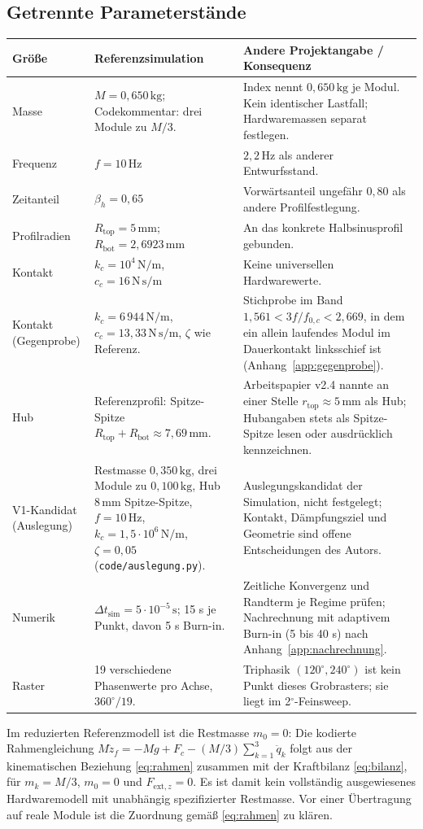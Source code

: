 \documentclass[11pt,a4paper]{article}
\begin{document}
\subsection{Getrennte Parameterstände}
\begin{longtable}{@{}L{.24\textwidth}L{.33\textwidth}L{.38\textwidth}@{}}
\toprule\textbf{Größe}&\textbf{Referenzsimulation}&\textbf{Andere Projektangabe / Konsequenz}\\\midrule\endhead
Masse&$M=0{,}650\,\mathrm{kg}$; Codekommentar: drei Module zu $M/3$.&Index nennt $0{,}650\,\mathrm{kg}$ je Modul. Kein identischer Lastfall; Hardwaremassen separat festlegen.\\
Frequenz&$f=10\,\mathrm{Hz}$&$2{,}2\,\mathrm{Hz}$ als anderer Entwurfsstand.\\
Zeitanteil&$\beta_h=0{,}65$&Vorwärtsanteil ungefähr $0{,}80$ als andere Profilfestlegung.\\
Profilradien&$R_{\mathrm{top}}=5\,\mathrm{mm}$; $R_{\mathrm{bot}}=2{,}6923\,\mathrm{mm}$&An das konkrete Halbsinusprofil gebunden.\\
Kontakt&$k_c=10^4\,\mathrm{N/m}$, $c_c=16\,\mathrm{N\,s/m}$&Keine universellen Hardwarewerte.\\
Kontakt (Gegenprobe)&$k_c=6\,944\,\mathrm{N/m}$, $c_c=13{,}33\,\mathrm{N\,s/m}$, $\zeta$ wie Referenz.&Stichprobe im Band $1{,}561<3f/f_{0,c}<2{,}669$, in dem ein allein laufendes Modul im Dauerkontakt linksschief ist (Anhang~\ref{app:gegenprobe}).\\
Hub&Referenzprofil: Spitze-Spitze $R_{\mathrm{top}}+R_{\mathrm{bot}}\approx7{,}69\,\mathrm{mm}$.&Arbeitspapier v2.4 nannte an einer Stelle $r_{\mathrm{top}}\approx5\,\mathrm{mm}$ als Hub; Hubangaben stets als Spitze-Spitze lesen oder ausdrücklich kennzeichnen.\\
V1-Kandidat (Auslegung)&Restmasse $0{,}350\,\mathrm{kg}$, drei Module zu $0{,}100\,\mathrm{kg}$, Hub $8\,\mathrm{mm}$ Spitze-Spitze, $f=10\,\mathrm{Hz}$, $k_c=1{,}5\cdot10^6\,\mathrm{N/m}$, $\zeta=0{,}05$ (\texttt{code/auslegung.py}).&Auslegungskandidat der Simulation, nicht festgelegt; Kontakt, Dämpfungsziel und Geometrie sind offene Entscheidungen des Autors.\\
Numerik&$\Delta t_{\mathrm{sim}}=5\cdot10^{-5}\,\mathrm s$; 15 s je Punkt, davon 5 s Burn-in.&Zeitliche Konvergenz und Randterm je Regime prüfen; Nachrechnung mit adaptivem Burn-in (5 bis 40 s) nach Anhang~\ref{app:nachrechnung}.\\
Raster&19 verschiedene Phasenwerte pro Achse, $360^\circ/19$.&Triphasik $(120^\circ,240^\circ)$ ist kein Punkt dieses Grobrasters; sie liegt im 2$^\circ$-Feinsweep.\\
\bottomrule\end{longtable}
Im reduzierten Referenzmodell ist die Restmasse $m_0=0$: Die kodierte Rahmengleichung $M\ddot z_f=-Mg+F_c-(M/3)\sum_{k=1}^{3}\ddot q_k$ folgt aus der kinematischen Beziehung \eqref{eq:rahmen} zusammen mit der Kraftbilanz \eqref{eq:bilanz}, für $m_k=M/3$, $m_0=0$ und $F_{\mathrm{ext},z}=0$. Es ist damit kein vollständig ausgewiesenes Hardwaremodell mit unabhängig spezifizierter Restmasse. Vor einer Übertragung auf reale Module ist die Zuordnung gemäß \eqref{eq:rahmen} zu klären.
\end{document}
